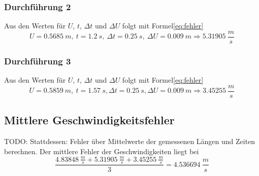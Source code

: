 \documentclass{article}
\begin{document}
            \subsubsection{Durchführung 2}
                Aus den Werten für \(U\), \(t\), \( \Delta t \) und \(\Delta U \) folgt mit Formel\ref{eq:fehler}
                \begin{equation}
                    U = \SI{0.5685}{m},\ t = \SI{1.2}{s},\ \Delta t = \SI{0.25}{s},\ \Delta U = \SI{0.009}{m} \Rightarrow \SI{5.31905}{\frac{m}{s}} 
                \end{equation}
            \subsubsection{Durchführung 3}
                Aus den Werten für \(U\), \(t\), \( \Delta t \) und \(\Delta U \) folgt mit Formel\ref{eq:fehler}
                \begin{equation}
                    U = \SI{0.5859}{m},\ t = \SI{1.57}{s}, \Delta t = \SI{0.25}{s}, \Delta U = \SI{0.009}{m} \Rightarrow \SI{3.45255}{\frac{m}{s}} 
                \end{equation}

        \subsection{Mittlere Geschwindigkeitsfehler}
            TODO: Stattdessen: Fehler über Mittelwerte der gemessenen Längen und Zeiten berechnen.
            Der mittlere Fehler der Geschwindigkeiten liegt bei
            \begin{equation} \label{val:geschw_fehler}
                \frac{ \SI{4.83848}{\frac{m}{s}} + \SI{5.31905}{\frac{m}{s}} + \SI{3.45255}{\frac{m}{s}} }{3} = \SI{4.536694}{\frac{m}{s}}
            \end{equation}
\end{document}
